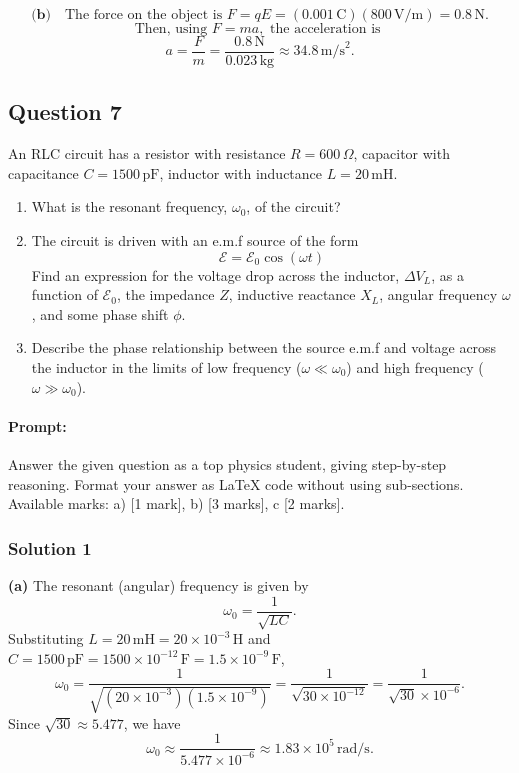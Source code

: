 \documentclass{article}
\begin{document}
\[
\textbf{(b)}\quad \text{The force on the object is } F = qE = (0.001\,\text{C})(800\,\text{V/m}) = 0.8\,\text{N}.
\]
\[
\text{Then, using } F = ma, \text{ the acceleration is }
\]
\[
a = \frac{F}{m} = \frac{0.8\,\text{N}}{0.023\,\text{kg}} \approx 34.8\,\text{m/s}^2.
\]

\subsection{Question 7}
An RLC circuit has a resistor with resistance $R = 600\,\Omega$, capacitor with capacitance $C = 1500\,\mathrm{pF}$, inductor with inductance $L = 20\,\mathrm{mH}$.  

\begin{enumerate}
    \item[(a)] What is the resonant frequency, $\omega_0$, of the circuit?  

    \item[(b)] The circuit is driven with an e.m.f source of the form  
    \[
    \mathcal{E} = \mathcal{E}_0 \cos(\omega t)
    \]  
    Find an expression for the voltage drop across the inductor, $\Delta V_L$, as a function of $\mathcal{E}_0$, the impedance $Z$, inductive reactance $X_L$, angular frequency $\omega$, and some phase shift $\phi$.  

    \item[(c)] Describe the phase relationship between the source e.m.f and voltage across the inductor in the limits of low frequency ($\omega \ll \omega_0$) and high frequency ($\omega \gg \omega_0$).
\end{enumerate}


\paragraph{Prompt: \\} 
Answer the given question as a top physics student, giving step-by-step reasoning. Format your answer as LaTeX code without using sub-sections. Available marks: a) [1 mark], b) [3 marks], c [2 marks].

\subsubsection{Solution 1}
\textbf{(a)} \quad The resonant (angular) frequency is given by 
\[
\omega_0 = \frac{1}{\sqrt{LC}}.
\]
Substituting \( L = 20\,\mathrm{mH} = 20\times10^{-3}\,\mathrm{H} \) and \( C = 1500\,\mathrm{pF} = 1500\times10^{-12}\,\mathrm{F} = 1.5\times10^{-9}\,\mathrm{F} \),
\[
\omega_0 = \frac{1}{\sqrt{(20\times10^{-3})(1.5\times10^{-9})}} 
= \frac{1}{\sqrt{30\times10^{-12}}} 
= \frac{1}{\sqrt{30}\times10^{-6}}.
\]
Since \(\sqrt{30} \approx 5.477\), we have 
\[
\omega_0 \approx \frac{1}{5.477\times10^{-6}} \approx 1.83\times10^5\,\mathrm{rad/s}.
\]
\end{document}
